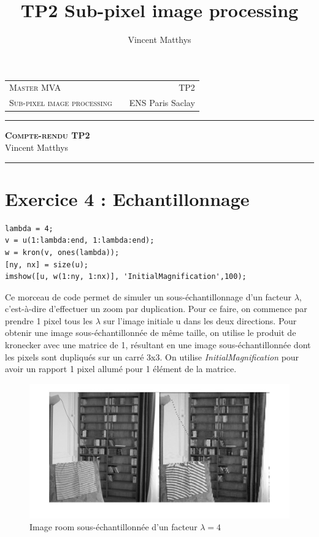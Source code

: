 \documentclass[12pt,a4paper,onecolumn]{article}
\title{TP2 Sub-pixel image processing}
\author{Vincent Matthys}
\begin{document}
\begin{tabularx}{0.8\textwidth}{@{} l X r @{} }
{\textsc{Master MVA}} & & \textsc{TP2}\\
\textsc{Sub-pixel image processing} & & {ENS Paris Saclay}\\
\end{tabularx}
\vspace{1.5cm}
\begin{center}

\rule[11pt]{5cm}{0.5pt}

\textbf{\LARGE \textsc{Compte-rendu TP2}}
\vspace{0.5cm}\\
Vincent Matthys\\
\rule{5cm}{0.5pt}

\vspace{1.5cm}
\end{center}

\section*{Exercice 4 : Echantillonnage}

\begin{lstlisting}[caption = {Zoom par duplication}]
lambda = 4;
v = u(1:lambda:end, 1:lambda:end);
w = kron(v, ones(lambda));
[ny, nx] = size(u);
imshow([u, w(1:ny, 1:nx)], 'InitialMagnification',100);
\end{lstlisting}
Ce morceau de code permet de simuler un sous-échantillonnage d'un facteur $\lambda$, c'est-à-dire d'effectuer un zoom par duplication. Pour ce faire, on commence par prendre 1 pixel tous les $\lambda$ sur l'image initiale u dans les deux directions. Pour obtenir une image sous-échantillonnée de même taille, on utilise le produit de kronecker avec une matrice de 1, résultant en une image sous-échantillonnée dont les pixels sont dupliqués sur un carré 3x3. On utilise \textit{InitialMagnification} pour avoir un rapport 1 pixel allumé pour 1 élément de la matrice.

\begin{figure}[H]
\begin{center}
\includegraphics[width = \textwidth]{ex4_1.jpg}
\end{center}
\caption{Image room sous-échantillonnée d'un facteur $\lambda = 4$}
\label{room_l_4}
\end{figure}
\end{document}
